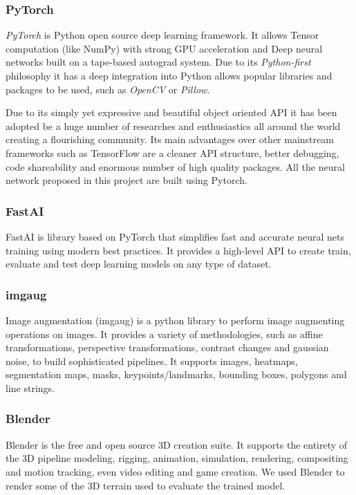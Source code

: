 \documentclass[../document.tex]{subfiles}
\begin{document}
\subsubsection{PyTorch}
\emph{PyTorch} is Python open source deep learning framework. It allows Tensor computation (like NumPy) with strong GPU acceleration and Deep neural networks built on a tape-based autograd system. Due to its \emph{Python-first} philosophy it has a deep integration into Python allows popular libraries and packages to be used, such as \emph{OpenCV} or \emph{Pillow}.  

Due to its simply yet expressive and beautiful object oriented API it has been adopted be a huge number of researches and enthusiastics all around the world creating a flourishing community. 
Its main advantages over other mainstream frameworks such as TensorFlow  are a cleaner API structure, better debugging, code shareability and enormous number of high quality packages. All the neural network proposed in this project are built using Pytorch.

\subsubsection{FastAI}
FastAI is  library based on PyTorch that simplifies fast and accurate neural nets training using modern best practices. It provides a high-level API to create train, evaluate and test deep learning models on any type of dataset.

\subsubsection{imgaug}
Image augmentation (imgaug) is a python library to perform image augmenting operations on images. It provides a variety of methodologies, such as affine transformations, perspective transformations, contrast changes and gaussian noise, to build sophisticated pipelines. It supports images,  heatmaps, segmentation maps, masks, keypoints/landmarks, bounding boxes, polygons and line strings.

\subsubsection{Blender}
Blender is the free and open source 3D creation suite. It supports the entirety of the 3D pipeline modeling, rigging, animation, simulation, rendering, compositing and motion tracking, even video editing and game creation. We used Blender to render some of the 3D terrain used to evaluate the  trained model.
\end{document}
